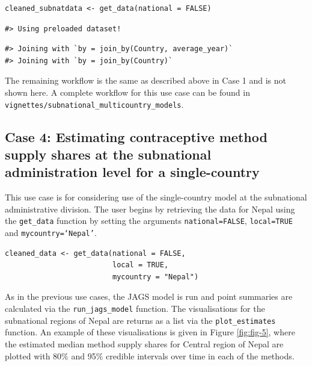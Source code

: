 \begin{verbatim}
cleaned_subnatdata <- get_data(national = FALSE)
\end{verbatim}

\begin{verbatim}
#> Using preloaded dataset!
\end{verbatim}

\begin{verbatim}
#> Joining with `by = join_by(Country, average_year)`
#> Joining with `by = join_by(Country)`
\end{verbatim}

The remaining workflow is the same as described above in Case 1 and is not shown here. A complete workflow for this use case can be found in \texttt{vignettes/subnational\_multicountry\_models}.

\subsection{Case 4: Estimating contraceptive method supply shares at the subnational administration level for a single-country}\label{case-4-estimating-contraceptive-method-supply-shares-at-the-subnational-administration-level-for-a-single-country}

This use case is for considering use of the single-country model at the subnational administrative division. The user begins by retrieving the data for Nepal using the \texttt{get\_data} function by setting the arguments \texttt{national=FALSE}, \texttt{local=TRUE} and \texttt{mycountry=‘Nepal’}.

\begin{verbatim}
cleaned_data <- get_data(national = FALSE, 
                         local = TRUE,
                         mycountry = "Nepal")
\end{verbatim}

As in the previous use cases, the JAGS model is run and point summaries are calculated via the \texttt{run\_jags\_model} function. The visualisations for the subnational regions of Nepal are returns as a list via the \texttt{plot\_estimates} function. An example of these visualisations is given in Figure \ref{fig:fig-5}, where the estimated median method supply shares for Central region of Nepal are plotted with 80\% and 95\% credible intervals over time in each of the methods.



